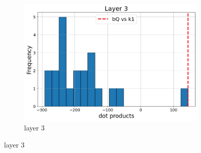 \documentclass[11pt]{article}
\begin{document}
\begin{figure}[t]
\begin{subfigure}[t]{0.24\textwidth}
  \end{subfigure}\hfill
  \begin{subfigure}[t]{0.24\textwidth}
    \centering
    \includegraphics[width=1.4\columnwidth]{figures/obs1_appendix/obs1_layer3.png}
    \caption{layer 3}
  \end{subfigure}\hfill
    \vspace{2mm}


\end{figure}
\end{document}
